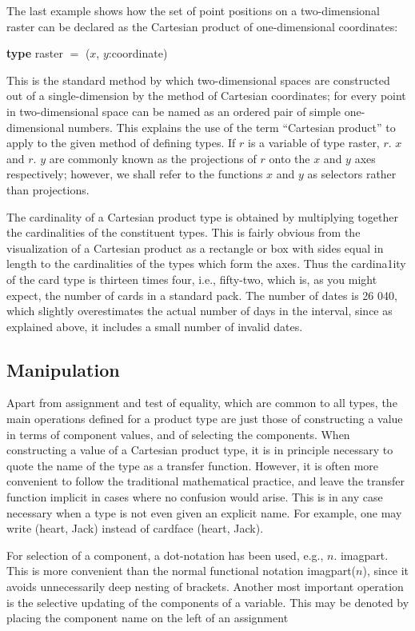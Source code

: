 The last example shows how the set of point positions on a two-dimensional raster can be declared as the Cartesian product of one-dimensional coordinates:

\quad \textbf{type} raster $=$ ($x$, $y$:coordinate)

This is the standard method by which two-dimensional spaces are constructed out of a single-dimension by the method of Cartesian coordinates; for every point in two-dimensional space can be named as an ordered pair of simple one-dimensional numbers. This explains the use of the term ``Cartesian product'' to apply to the given method of defining types. If $r$ is a variable of type raster, $r$. $x$ and $r$. $y$ are commonly known as the projections of $r$ onto the $x$ and $y$ axes respectively; however, we shall refer to the functions $x$ and $y$ as selectors rather than projections.

The cardinality of a Cartesian product type is obtained by multiplying together the cardinalities of the constituent types. This is fairly obvious from the visualization of a Cartesian product as a rectangle or box with sides equal in length to the cardinalities of the types which form the axes. Thus the cardina1ity of the card type is thirteen times four, i.e., fifty-two, which is, as you might expect, the number of cards in a standard pack. The number of dates is 26 040, which slightly overestimates the actual number of days in the interval, since as explained above, it includes a small number of invalid dates.

\subsection{Manipulation}

Apart from assignment and test of equality, which are common to all types, the main operations defined for a product type are just those of constructing a value in terms of component values, and of selecting the components. When constructing a value of a Cartesian product type, it is in principle necessary to quote the name of the type as a transfer function. However, it is often more convenient to follow the traditional mathematical practice, and leave the transfer function implicit in cases where no confusion would arise. This is in any case necessary when a type is not even given an explicit name. For example, one may write (heart, Jack) instead of cardface (heart, Jack).

For selection of a component, a dot-notation has been used, e.g., $n$. imagpart. This is more convenient than the normal functional notation imagpart($n$), since it avoids unnecessarily deep nesting of brackets. Another most important operation is the selective updating of the components of a variable. This may be denoted by placing the component name on the left of an assignment

